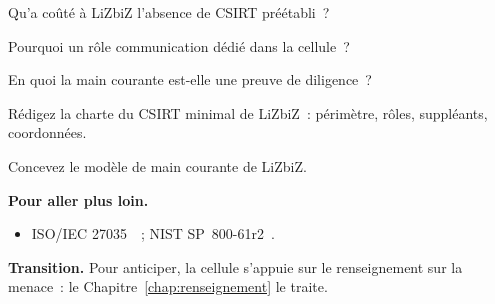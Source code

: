 \begin{boxexo}[title={\ding{45}\quad Exercice~16.6. MAYO \niveaumoyen}]
Qu'a coûté à LiZbiZ l'absence de CSIRT préétabli~?
\end{boxexo}

\begin{boxexo}[title={\ding{45}\quad Exercice~16.7. Communication \niveaumoyen}]
Pourquoi un rôle communication dédié dans la cellule~?
\end{boxexo}

\begin{boxexo}[title={\ding{45}\quad Exercice~16.8. Opposabilité \niveaumoyen}]
En quoi la main courante est-elle une preuve de diligence~?
\end{boxexo}

\begin{boxexo}[title={\ding{45}\quad Exercice~16.9. Charte de CSIRT \niveauexpert}]
Rédigez la charte du CSIRT minimal de LiZbiZ~: périmètre, rôles, suppléants,
coordonnées.
\end{boxexo}

\begin{boxexo}[title={\ding{45}\quad Exercice~16.10. Modèle de main courante \niveauexpert}]
Concevez le modèle de main courante de LiZbiZ.
\end{boxexo}

\bigskip

\begin{boxinfo}
\textbf{Pour aller plus loin.}
\begin{itemize}
    \item ISO/IEC 27035~\cite{iso27035}~; NIST SP~800-61r2~\cite{nist80061r2}.
\end{itemize}
\end{boxinfo}

\begin{boxinfo}
\textbf{Transition.} Pour anticiper, la cellule s'appuie sur le renseignement
sur la menace~: le Chapitre~\ref{chap:renseignement} le traite.
\end{boxinfo}
